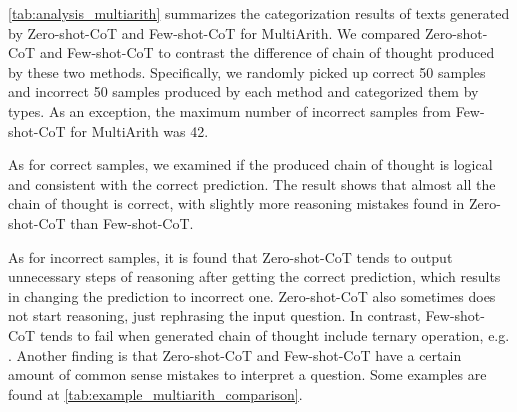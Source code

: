 \documentclass{article}
\newcommand{\CoT}{chain of thought\xspace}
\newcommand{\ours}{Zero-shot-CoT\xspace}
\newcommand{\theirs}{Few-shot-CoT\xspace}
\begin{document}
 
\autoref{tab:analysis_multiarith} summarizes the categorization results of texts generated by \ours and \theirs for MultiArith. We compared \ours and \theirs to contrast the difference of \CoT produced by these two methods. Specifically, we randomly picked up correct 50 samples and incorrect 50 samples produced by each method and categorized them by types. As an exception, the maximum number of incorrect samples from \theirs for MultiArith was 42. 



As for correct samples, we examined if the produced \CoT is logical and consistent with the correct prediction. The result shows that almost all the \CoT is correct, with slightly more reasoning mistakes found in Zero-shot-CoT than Few-shot-CoT.


As for incorrect samples, it is found that \ours tends to output unnecessary steps of reasoning after getting the correct prediction, which results in changing the prediction to incorrect one. 
\ours also sometimes does not start reasoning, just rephrasing the input question.
In contrast, \theirs tends to fail when generated \CoT include ternary operation, e.g. . Another finding is that \ours and \theirs have a certain amount of common sense mistakes to interpret a question. Some examples are found at \autoref{tab:example_multiarith_comparison}.
\end{document}
